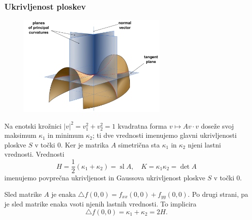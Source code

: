 \documentclass[8pt]{beamer}
\theoremstyle{definition}
\theoremstyle{remark}
\theoremstyle{plain}
\numberwithin{equation}{section}  %
\begin{document}
\begin{frame}
    \frametitle{Ukrivljenost ploskev}

    \begin{figure}
        \includegraphics[width=20em]{../Slike/Minimal_surface_curvature_planes.pdf}
    \end{figure}

    Na enotski krožnici $|v|^2=v_1^2+v_2^2=1$ kvadratna forma $v \mapsto A v \cdot v$ doseže svoj maksimum $\kappa_1$ in minimum $\kappa_2$; ti dve vrednosti imenujemo \textcolor{red1}{glavni ukrivljenosti} ploskve $S$ v točki $0$. Ker je matrika $A$ simetrična sta $\kappa_1$ in $\kappa_2$ njeni lastni vrednosti. Vrednosti 
    \begin{equation*}
        H=\frac{1}{2}(\kappa_1+\kappa_2)=\operatorname{sl} A, \quad K=\kappa_1 \kappa_2=\operatorname{det} A
    \end{equation*}
    imenujemo \textcolor{red1}{povprečna ukrivljenost} in \textcolor{red1}{Gaussova ukrivljenost} ploskve $S$ v točki $0$. 

    \vspace{0.8em}

    Sled matrike $A$ je enaka $\bigtriangleup f(0,0)=f_{x x}(0,0)+f_{y y}(0,0)$. Po drugi strani, pa je sled matrike enaka vsoti njenih lastnih vrednosti. To implicira 
    \begin{equation*}
        \bigtriangleup f(0,0)=\kappa_1+\kappa_2=2H.
    \end{equation*}

\end{frame}
\end{document}
